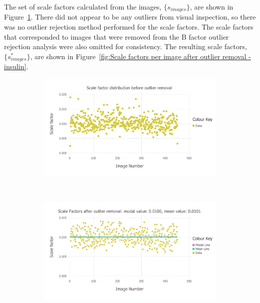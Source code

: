 The set of scale factors calculated from the images, $\{ s_{images} \}$, are shown in Figure~\ref{fig:Scale factors per image before outlier removal - insulin}.
There did not appear to be any outliers from visual inspection, so there was no outlier rejection method performed for the scale factors.
The scale factors that corresponded to images that were removed from the B factor outlier rejection analysis were also omitted for consistency.
The resulting scale factors, $\{ s^{*}_{images} \}$, are shown in Figure~\ref{fig:Scale factors per image after outlier removal - insulin}.
\begin{figure}
    \centering
    \begin{subfigure}[b]{1.0\textwidth}
            \centering
            \includegraphics[width=\textwidth]{figures/datared/ScaleFac_Plot_Before_outlier_removal.pdf}
            \caption{}
            \label{fig:Scale factors per image before outlier removal - insulin}
    \end{subfigure}
    \\
    \begin{subfigure}[b]{1.0\textwidth}
            \centering
            \includegraphics[width=\textwidth]{figures/datared/ScaleFac_Plot_After_outlier_removal.pdf}

\end{subfigure}
\end{figure}
